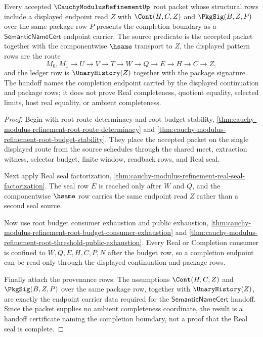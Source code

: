 \begin{theorem}
\label{thm:cauchy-modulus-refinement-real-seal-handoff}
Every accepted $\CauchyModulusRefinementUp$ root packet whose structural rows include a displayed endpoint read $Z$ with $\Cont(H,C,Z)$ and $\PkgSig(B,Z,P)$ over the same package row $P$ presents the completion boundary as a $\mathsf{SemanticNameCert}$ endpoint carrier. The source predicate is the accepted packet together with the componentwise $\hsame$ transport to $Z$, the displayed pattern rows are the route
$$
M_0,M_1 \to U \to V \to T \to W \to Q \to E \to H \to C \to Z,
$$
and the ledger row is $\UnaryHistory(Z)$ together with the package signature. The handoff names the completion endpoint carried by the displayed continuation and package rows; it does not prove Real completeness, quotient equality, selected limits, host real equality, or ambient completeness.
\end{theorem}
\begin{proof}
Begin with root route determinacy and root budget stability, \autoref{thm:cauchy-modulus-refinement-root-route-determinacy} and \autoref{thm:cauchy-modulus-refinement-root-budget-stability}. They place the accepted packet on the single displayed route from the source schedules through the shared meet, extraction witness, selector budget, finite window, readback rows, and Real seal.

Next apply Real seal factorization, \autoref{thm:cauchy-modulus-refinement-real-seal-factorization}. The seal row $E$ is reached only after $W$ and $Q$, and the componentwise $\hsame$ row carries the same endpoint read $Z$ rather than a second seal source.

Now use root budget consumer exhaustion and public exhaustion, \autoref{thm:cauchy-modulus-refinement-root-budget-consumer-exhaustion} and \autoref{thm:cauchy-modulus-refinement-root-threshold-public-exhaustion}. Every Real or Completion consumer is confined to $W,Q,E,H,C,P,N$ after the budget row, so a completion endpoint can be read only through the displayed continuation and package rows.

Finally attach the provenance rows. The assumptions $\Cont(H,C,Z)$ and $\PkgSig(B,Z,P)$ over the same package row, together with $\UnaryHistory(Z)$, are exactly the endpoint carrier data required for the $\mathsf{SemanticNameCert}$ handoff. Since the packet supplies no ambient completeness coordinate, the result is a handoff certificate naming the completion boundary, not a proof that the Real seal is complete.
\end{proof}

